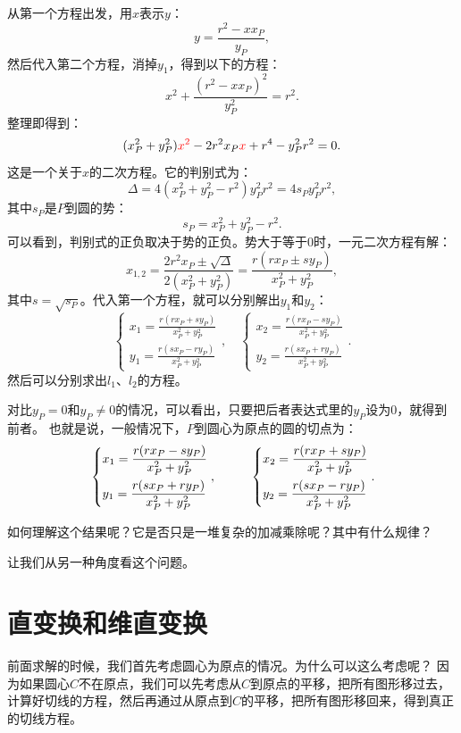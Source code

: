 \documentclass[12pt,UTF8]{ctexbook}
\begin{document}
从第一个方程出发，用$x$表示$y$：
$$ y = \frac{r^2 - xx_P}{y_P},$$
然后代入第二个方程，消掉$y_1$，得到以下的方程：
$$ x^2 + \frac{(r^2 - xx_P)^2}{y_P^2} = r^2.$$
整理即得到：
$$ (x_P^2+y_P^2){\color{red}x^2} - 2r^2x_P{\color{red}x} + r^4 - y_P^2r^2 = 0.$$
这是一个关于$x$的二次方程。它的判别式为：
$$\Delta = 4(x_P^2+y_P^2 - r^2)y_P^2r^2 = 4s_Py_P^2r^2,$$
其中$s_P$是$P$到圆的势：
$$ s_P = x_P^2+y_P^2 - r^2. $$
可以看到，判别式的正负取决于势的正负。势大于等于$0$时，一元二次方程有解：
$$x_{1,2} = \frac{2r^2x_P \pm \sqrt{\Delta} }{2(x_P^2+y_P^2)} =  \frac{r(rx_P \pm sy_P) }{x_P^2+y_P^2}, $$
其中$s = \sqrt{s_P}$。代入第一个方程，就可以分别解出$y_1$和$y_2$：
$$
    \left\{ \begin{array}{rrc}
        x_1 =\displaystyle \frac{r(rx_P + sy_P) }{x_P^2+y_P^2} \\
        y_1 =\displaystyle  \frac{r(sx_P - ry_P)}{x_P^2+y_P^2}
    \end{array}\right., 
    \quad
    \left\{ \begin{array}{rrc}
        x_2 =\displaystyle  \frac{r(rx_P - sy_P) }{x_P^2+y_P^2} \\
        y_2 =\displaystyle  \frac{r(sx_P + ry_P)}{x_P^2+y_P^2}
    \end{array}\right..
$$
然后可以分别求出$l_1$、$l_2$的方程。

对比$y_P=0$和$y_P\neq 0$的情况，可以看出，只要把后者表达式里的$y_P$设为$0$，就得到前者。
也就是说，一般情况下，$P$到圆心为原点的圆的切点为：
\begin{alignat*}{2}
    &   \begin{dcases}
        x_1 = \frac{r(rx_P - sy_P) }{x_P^2+y_P^2} \\
        y_1 = \frac{r(sx_P + ry_P)}{x_P^2+y_P^2}
      \end{dcases}
    ,& \quad\quad
      \begin{dcases}
        x_2 = \frac{r(rx_P + sy_P) }{x_P^2+y_P^2} \\
        y_2 = \frac{r(sx_P - ry_P)}{x_P^2+y_P^2}
      \end{dcases}
    .
\end{alignat*}

如何理解这个结果呢？它是否只是一堆复杂的加减乘除呢？其中有什么规律？

让我们从另一种角度看这个问题。

\section{直变换和维直变换}
前面求解的时候，我们首先考虑圆心为原点的情况。为什么可以这么考虑呢？
因为如果圆心$C$不在原点，我们可以先考虑从$C$到原点的平移，把所有图形移过去，
计算好切线的方程，然后再通过从原点到$C$的平移，把所有图形移回来，得到真正的切线方程。
\end{document}
